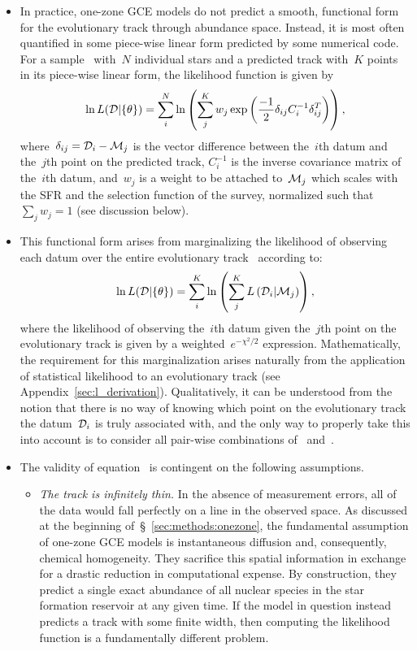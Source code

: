 \documentclass[ms.tex]{subfiles}
\begin{document}
\begin{itemize}
	\item In practice, one-zone GCE models do not predict a smooth, functional
	form for the evolutionary track through abundance space.
	Instead, it is most often quantified in some piece-wise linear form
	predicted by some numerical code.
	For a sample~ with~$N$ individual stars and a predicted track
	 with~$K$ points in its piece-wise linear form, the likelihood
	function is given by
	\begin{equation}
	\ln L(\mathcal{D} | \{\theta\}) = \sum_i^N \ln \left(
	\sum_j^K w_j \exp \left(
	\frac{-1}{2} \delta_{ij} C_i^{-1} \delta_{ij}^T
	\right)
	\right),
	\label{eq:likelihood}
	\end{equation}
	where~$\delta_{ij} = \mathcal{D}_i - \mathcal{M}_j$ is the vector difference
	between the~$i$th datum and the~$j$th point on the predicted track,
	$C_i^{-1}$ is the inverse covariance matrix of the~$i$th datum, and~$w_j$
	is a weight to be attached to~$\mathcal{M}_j$ which scales with the
	SFR and the selection function of the survey, normalized such that
	$\sum_j w_j = 1$ (see discussion below).

	\item This functional form arises from marginalizing the likelihood of
	observing each datum over the entire evolutionary track~
	according to:
	\begin{equation}
	\ln L(\mathcal{D} | \{\theta\}) = \sum_i^K \ln \left(
	\sum_j^K L\left(\mathcal{D}_i | \mathcal{M}_j
	\right)\right),
	\end{equation}
	where the likelihood of observing the~$i$th datum given the~$j$th point on
	the evolutionary track is given by a weighted~$e^{-\chi^2/2}$
	expression.
	Mathematically, the requirement for this marginalization arises naturally
	from the application of statistical likelihood to an evolutionary track
	(see Appendix~\ref{sec:l_derivation}).
	Qualitatively, it can be understood from the notion that there is no way
	of knowing which point on the evolutionary track the datum~$\mathcal{D}_i$
	is truly associated with, and the only way to properly take this into
	account is to consider all pair-wise combinations of~
	and~.

	\item The validity of equation~ is contingent on the
	following assumptions.
	\begin{itemize}
		\item \textit{The track is infinitely thin.}
		In the absence of measurement errors, all of the data would fall
		perfectly on a line in the observed space.
		As discussed at the beginning of~\S~\ref{sec:methods:onezone}, the
		fundamental assumption of one-zone GCE models is instantaneous
		diffusion and, consequently, chemical homogeneity.
		They sacrifice this spatial information in exchange for a drastic
		reduction in computational expense.
		By construction, they predict a single exact abundance of all nuclear
		species in the star formation reservoir at any given time.
		If the model in question instead predicts a track with some finite
		width, then computing the likelihood function is a fundamentally
		different problem.


\end{itemize}
\end{itemize}
\end{document}

